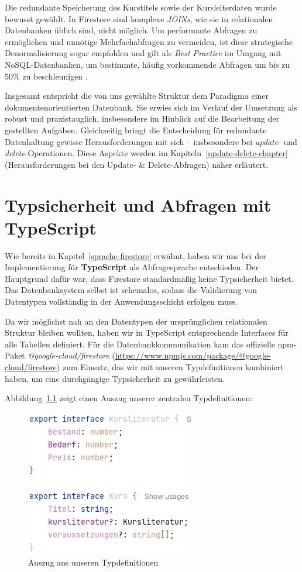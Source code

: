 \documentclass[12pt,a4paper%
              ,oneside     %
              ,titlepage
              ,DIV=13
              ,headinclude
              ,footinclude=false%
              ,cleardoublepage=empty%
              ,parskip=half,
              BCOR=0mm,
              ]{scrreprt}
\begin{document}
Die redundante Speicherung des Kurstitels sowie der Kursleiterdaten wurde bewusst gewählt. In Firestore sind komplexe \textit{JOINs}, wie sie in relationalen Datenbanken üblich sind, nicht möglich. Um performante Abfragen zu ermöglichen und unnötige Mehrfachabfragen zu vermeiden, ist diese strategische Denormalisierung sogar empfohlen und gilt als \textit{Best Practice} im Umgang mit NoSQL-Datenbanken, um bestimmte, häufig vorkommende Abfragen um bis zu 50\% zu beschleunigen \cite{Estuary.2025, MoldStud.2025}.

Insgesamt entspricht die von uns gewählte Struktur dem Paradigma einer dokumentenorientierten Datenbank. Sie erwies sich im Verlauf der Umsetzung als robust und praxistauglich, insbesondere im Hinblick auf die Bearbeitung der gestellten Aufgaben. Gleichzeitig bringt die Entscheidung für redundante Datenhaltung gewisse Herausforderungen mit sich – insbesondere bei \textit{update}- und \textit{delete}-Operationen. Diese Aspekte werden im Kapiteln~\ref{update-delete-chapter} (\glqq Herausforderungen bei den Update- \& Delete-Abfragen\grqq{}) näher erläutert.

\chapter{Typsicherheit und Abfragen mit TypeScript}
\label{typ-sicherheit-chapter}

Wie bereits in Kapitel~\ref{sprache-firestore} erwähnt, haben wir uns bei der Implementierung für \textbf{TypeScript} als Abfragesprache entschieden. Der Hauptgrund dafür war, dass Firestore standardmäßig keine Typsicherheit bietet. Das Datenbanksystem selbst ist schemalos, sodass die Validierung von Datentypen vollständig in der Anwendungsschicht erfolgen muss.

Da wir möglichst nah an den Datentypen der ursprünglichen relationalen Struktur bleiben wollten, haben wir in TypeScript entsprechende Interfaces für alle Tabellen definiert. Für die Datenbankkommunikation kam das offizielle npm-Paket \textit{@google-cloud/firestore} (\url{https://www.npmjs.com/package/@google-cloud/firestore}) zum Einsatz, das wir mit unseren Typdefinitionen kombiniert haben, um eine durchgängige Typsicherheit zu gewährleisten.

Abbildung~\ref{fig:types} zeigt einen Auszug unserer zentralen Typdefinitionen:

\begin{figure}[H]
	\centering
	\includegraphics{img/types.png}
	\caption{Auszug aus unseren Typdefinitionen}
	\label{fig:types}
\end{figure}
\end{document}
